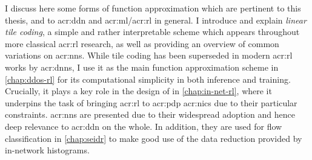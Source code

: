 I discuss here some forms of function approximation which are pertinent to this thesis, and to \gls{acr:ddn} and \gls{acr:ml}/\gls{acr:rl} in general.
I introduce and explain \emph{linear tile coding}, a simple and rather interpretable scheme which appears throughout more classical \gls{acr:rl} research, as well as providing an overview of common variations on \glspl{acr:nn}.
While tile coding has been superseded in modern \gls{acr:rl} works by \glspl{acr:dnn}, I use it as the main function approximation scheme in \cref{chap:ddos-rl} for its computational simplicity in both inference and training.
Crucially, it plays a key role in the design of \approachshort{} in \cref{chap:in-net-rl}, where it underpins the task of bringing \gls{acr:rl} to \gls{acr:pdp} \glspl{acr:nic} due to their particular constraints.
\glspl{acr:nn} are presented due to their widespread adoption and hence deep relevance to \gls{acr:ddn} on the whole.
In addition, they are used for flow classification in \cref{chap:seidr} to make good use of the data reduction provided by in-network histograms.

%
%
%
%
%
%
%
%

